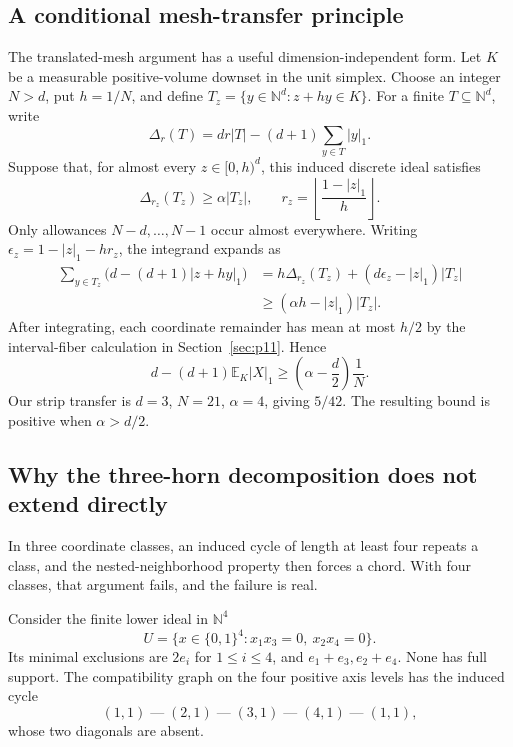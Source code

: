 \subsection{A conditional mesh-transfer principle}

The translated-mesh argument has a useful dimension-independent form.
Let \(K\) be a measurable positive-volume downset in the unit simplex.
Choose an integer \(N>d\), put \(h=1/N\), and define
\(T_z=\{y\in\mathbb N^d:z+hy\in K\}\).
For a finite \(T\subseteq\mathbb N^d\), write
\[
\Delta_r(T)=d r|T|-(d+1)\sum_{y\in T}|y|_1.
\]
Suppose that, for almost every \(z\in[0,h)^d\), this induced discrete
ideal satisfies
\[
\Delta_{r_z}(T_z)\ge\alpha|T_z|,
\qquad
r_z=\left\lfloor\frac{1-|z|_1}{h}\right\rfloor.
\]
Only allowances \(N-d,\ldots,N-1\) occur almost everywhere. Writing
\(\epsilon_z=1-|z|_1-hr_z\), the integrand expands as
\[
\begin{aligned}
\sum_{y\in T_z}\bigl(d-(d+1)|z+hy|_1\bigr)
&=h\Delta_{r_z}(T_z)+(d\epsilon_z-|z|_1)|T_z|\\
&\ge(\alpha h-|z|_1)|T_z|.
\end{aligned}
\]
After integrating, each coordinate remainder has mean at most \(h/2\)
by the interval-fiber calculation in Section~\ref{sec:p11}. Hence
\begin{equation}\label{eq:extension-mesh}
d-(d+1)\mathbb E_K|X|_1
\ge\left(\alpha-\frac d2\right)\frac1N.
\end{equation}
Our strip transfer is \(d=3\), \(N=21\), \(\alpha=4\), giving \(5/42\).
The resulting bound is positive when \(\alpha>d/2\).

\subsection{Why the three-horn decomposition does not extend directly}

In three coordinate classes, an induced cycle of length at least four
repeats a class, and the nested-neighborhood property then forces a chord.
With four classes, that argument fails, and the failure is real.

Consider the finite lower ideal in \(\mathbb N^4\)
\[
U=\{x\in\{0,1\}^4:x_1x_3=0,\ x_2x_4=0\}.
\]
Its minimal exclusions are \(2e_i\) for \(1\le i\le4\), and
\(e_1+e_3,e_2+e_4\). None has full support. The compatibility graph
on the four positive axis levels has the induced cycle
\[
(1,1)\;\text{---}\;(2,1)\;\text{---}\;(3,1)\;\text{---}\;(4,1)\;\text{---}\;(1,1),
\]
whose two diagonals are absent.

